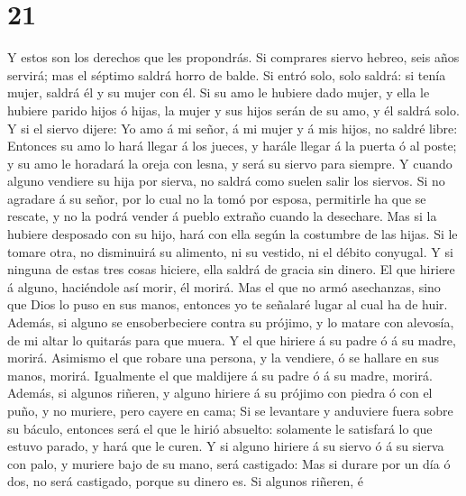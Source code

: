 \hypertarget{section-20}{%
\section{21}\label{section-20}}

 Y estos son los derechos que les propondrás.
 Si comprares siervo hebreo, seis años servirá; mas el
séptimo saldrá horro de balde.  Si entró solo, solo
saldrá: si tenía mujer, saldrá él y su mujer con él.  Si
su amo le hubiere dado mujer, y ella le hubiere parido hijos ó hijas, la
mujer y sus hijos serán de su amo, y él saldrá solo.  Y si
el siervo dijere: Yo amo á mi señor, á mi mujer y á mis hijos, no saldré
libre:  Entonces su amo lo hará llegar á los jueces, y
harále llegar á la puerta ó al poste; y su amo le horadará la oreja con
lesna, y será su siervo para siempre.  Y cuando alguno
vendiere su hija por sierva, no saldrá como suelen salir los siervos.
 Si no agradare á su señor, por lo cual no la tomó por
esposa, permitirle ha que se rescate, y no la podrá vender á pueblo
extraño cuando la desechare.  Mas si la hubiere desposado
con su hijo, hará con ella según la costumbre de las hijas.
 Si le tomare otra, no disminuirá su alimento, ni su
vestido, ni el débito conyugal.  Y si ninguna de estas
tres cosas hiciere, ella saldrá de gracia sin dinero.  El
que hiriere á alguno, haciéndole así morir, él morirá. 
Mas el que no armó asechanzas, sino que Dios lo puso en sus manos,
entonces yo te señalaré lugar al cual ha de huir. 
Además, si alguno se ensoberbeciere contra su prójimo, y lo matare con
alevosía, de mi altar lo quitarás para que muera.  Y el
que hiriere á su padre ó á su madre, morirá.  Asimismo el
que robare una persona, y la vendiere, ó se hallare en sus manos,
morirá.  Igualmente el que maldijere á su padre ó á su
madre, morirá.  Además, si algunos riñeren, y alguno
hiriere á su prójimo con piedra ó con el puño, y no muriere, pero cayere
en cama;  Si se levantare y anduviere fuera sobre su
báculo, entonces será el que le hirió absuelto: solamente le satisfará
lo que estuvo parado, y hará que le curen.  Y si alguno
hiriere á su siervo ó á su sierva con palo, y muriere bajo de su mano,
será castigado:  Mas si durare por un día ó dos, no será
castigado, porque su dinero es.  Si algunos riñeren, é
